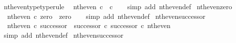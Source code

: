\begin{isabellebody}
\endisatagproof
{\isafoldproof}%
%
\isadelimproof
\isanewline
%
\endisadelimproof
\isanewline
{}\isamarkupfalse%
\ nth{\isacharunderscore}{\kern0pt}even{\isacharunderscore}{\kern0pt}type{\isacharbrackleft}{\kern0pt}type{\isacharunderscore}{\kern0pt}rule{\isacharbrackright}{\kern0pt}{\isacharcolon}{\kern0pt}\isanewline
\ \ {\isachardoublequoteopen}nth{\isacharunderscore}{\kern0pt}even{\isacharcolon}{\kern0pt}\ {\isasymnat}\isactrlsub c\ {\isasymrightarrow}\ {\isasymnat}\isactrlsub c{\isachardoublequoteclose}\isanewline
%
\isadelimproof
\ \ %
\endisadelimproof
%
\isatagproof
{}\isamarkupfalse%
\ {\isacharparenleft}{\kern0pt}simp\ add{\isacharcolon}{\kern0pt}\ nth{\isacharunderscore}{\kern0pt}even{\isacharunderscore}{\kern0pt}def{}{\isacharparenright}{\kern0pt}%
\endisatagproof
{\isafoldproof}%
%
\isadelimproof
\isanewline
%
\endisadelimproof
\isanewline
{}\isamarkupfalse%
\ nth{\isacharunderscore}{\kern0pt}even{\isacharunderscore}{\kern0pt}zero{\isacharcolon}{\kern0pt}\isanewline
\ \ {\isachardoublequoteopen}nth{\isacharunderscore}{\kern0pt}even\ {\isasymcirc}\isactrlsub c\ zero\ {\isacharequal}{\kern0pt}\ zero{\isachardoublequoteclose}\isanewline
%
\isadelimproof
\ \ %
\endisadelimproof
%
\isatagproof
{}\isamarkupfalse%
\ {\isacharparenleft}{\kern0pt}simp\ add{\isacharcolon}{\kern0pt}\ nth{\isacharunderscore}{\kern0pt}even{\isacharunderscore}{\kern0pt}def{}{\isacharparenright}{\kern0pt}%
\endisatagproof
{\isafoldproof}%
%
\isadelimproof
\isanewline
%
\endisadelimproof
\isanewline
{}\isamarkupfalse%
\ nth{\isacharunderscore}{\kern0pt}even{\isacharunderscore}{\kern0pt}successor{\isacharcolon}{\kern0pt}\isanewline
\ \ {\isachardoublequoteopen}nth{\isacharunderscore}{\kern0pt}even\ {\isasymcirc}\isactrlsub c\ successor\ {\isacharequal}{\kern0pt}\ {\isacharparenleft}{\kern0pt}successor\ {\isasymcirc}\isactrlsub c\ successor{\isacharparenright}{\kern0pt}\ {\isasymcirc}\isactrlsub c\ nth{\isacharunderscore}{\kern0pt}even{\isachardoublequoteclose}\isanewline
%
\isadelimproof
\ \ %
\endisadelimproof
%
\isatagproof
{}\isamarkupfalse%
\ {\isacharparenleft}{\kern0pt}simp\ add{\isacharcolon}{\kern0pt}\ nth{\isacharunderscore}{\kern0pt}even{\isacharunderscore}{\kern0pt}def{}{\isacharparenright}{\kern0pt}%
\endisatagproof
{\isafoldproof}%
%
\isadelimproof
\isanewline
%
\endisadelimproof
\isanewline
{}\isamarkupfalse%
\ nth{\isacharunderscore}{\kern0pt}even{\isacharunderscore}{\kern0pt}successor{}{\isacharcolon}{\kern0pt}\isanewline

\end{isabellebody}
